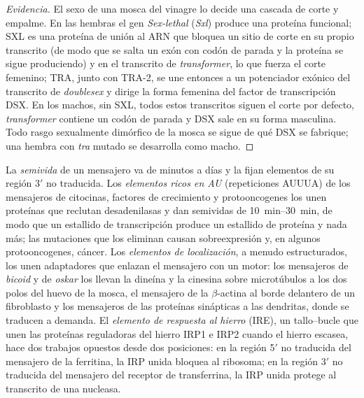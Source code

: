 \begin{proof}[Evidencia]
El sexo de una mosca del vinagre lo decide una cascada de corte y
empalme. En las hembras el gen \emph{Sex-lethal} (\emph{Sxl}) produce una
proteína funcional; SXL es una proteína de unión al ARN que bloquea un
sitio de corte en su propio transcrito (de modo que se salta un exón con
codón de parada y la proteína se sigue produciendo) y en el transcrito de
\emph{transformer}, lo que fuerza el corte femenino; TRA, junto con
TRA-2, se une entonces a un potenciador exónico del transcrito de
\emph{doublesex} y dirige la forma femenina del factor de transcripción
DSX. En los machos, sin SXL, todos estos transcritos siguen el corte por
defecto, \emph{transformer} contiene un codón de parada y DSX sale en su
forma masculina. Todo rasgo sexualmente dimórfico de la mosca se sigue de
qué DSX se fabrique; una hembra con \emph{tra} mutado se desarrolla como
macho.
\end{proof}

\begin{definition}\label{def:b3:rna-regulation:stability}
La \emph{semivida} de un mensajero va de minutos a días y la fijan
elementos de su región 3$'$ no traducida. Los \emph{elementos ricos en
AU} (repeticiones AUUUA) de los mensajeros de citocinas, factores de
crecimiento y protooncogenes los unen proteínas que reclutan
desadenilasas y dan semividas de \qtyrange{10}{30}{min}, de modo que un
estallido de transcripción produce un estallido de proteína y nada más;
las mutaciones que los eliminan causan sobreexpresión y, en algunos
protooncogenes, cáncer. Los \emph{elementos de localización}, a menudo
estructurados, los unen adaptadores que enlazan el mensajero con un
motor: los mensajeros de \emph{bicoid} y de \emph{oskar} los llevan la
dineína y la cinesina sobre microtúbulos a los dos polos del huevo de la
mosca, el mensajero de la $\beta$-actina al borde delantero de un
fibroblasto y los mensajeros de las proteínas sinápticas a las dendritas,
donde se traducen a demanda. El \emph{elemento de respuesta al hierro}
(IRE), un tallo--bucle que unen las proteínas reguladoras del hierro IRP1
e IRP2 cuando el hierro escasea, hace dos trabajos opuestos desde dos
posiciones: en la región 5$'$ no traducida del mensajero de la ferritina,
la IRP unida bloquea al ribosoma; en la región 3$'$ no traducida del
mensajero del receptor de transferrina, la IRP unida protege al
transcrito de una nucleasa.
\end{definition}

